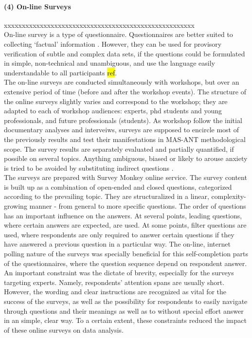\documentclass[11pt]{report}
\begin{document}
\paragraph{(4) On-line Surveys} xxxxxxxxxxxxxxxxxxxxxxxxxxxxxxxxxxxxxxxxxxxxxxxxxxxxx
\\
On-line survey is a type of questionnaire. Questionnaires  are  better  suited  to  collecting  ‘factual’ information . However, they can be used for provisory verification of subtle and complex data sets, if the questions could be formulated in simple, non-technical and unambiguous, and use the language easily understandable to all participants \hl{ref}.
\\
The on-line surveys are conducted simultaneously with workshops, but over an extensive period of time (before and after the workshop events). The structure of the online surveys slightly varies and correspond to the workshop; they are adapted to each of workshop audiences: experts, phd students and young professionals, and future professionals (students). As workshop follow the initial documentary analyses and interveiws, surveys are supposed to encircle most of the previously results and test their manifestations in MAS-ANT methodological scope. The survey results are separately evaluated and partially quantified, if possible on several topics. Anything ambiguous, biased or likely to arouse anxiety is tried to be avoided by substituting indirect questions .
\\
The surveys are prepared with Survey Monkey online service. The survey content is built up as a combination of open-ended and closed questions, categorized according to the prevailing topic. They are structuralized in a linear, complexity-growing manner - from general to more specific questions. The order of questions has an important influence on the answers. At several points, leading questions, where certain answers are expected, are used. At some points, filter questions are used, where respondents are only required to answer certain questions if they have answered a previous question in a particular way. The on-line, internet polling nature of the surveys was specially beneficial for this self-completion parts of the questionnaires, where the question sequence depend on respondent answer. 
\\
An important constraint was the dictate of brevity, especially for the surveys targeting experts. Namely, respondents’ attention spans are usually short. 
However, the wording and clear instructions are recognized as vital for the success of the surveys, as well as the possibility for respondents to easily navigate through questions and their meanings as well as to without special effort answer in an simple, clear way. To a certain extent, these constraints reduced the impact of these online surveys on data analysis.
\end{document}
